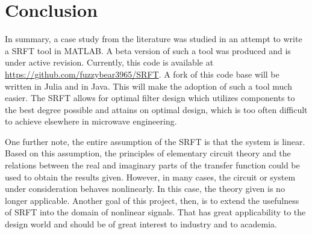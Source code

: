 \section*{Conclusion}

In summary, a case study from the literature was studied in an attempt to write
a SRFT tool in MATLAB\textsuperscript{\textregistered}. A beta version of such a
tool was produced and is under active revision. Currently, this code is
available at \url{https://github.com/fuzzybear3965/SRFT}. A fork of this
code base will be written in Julia and in Java. This will make the adoption of
such a tool much easier. The SRFT allows for optimal filter design which
utilizes components to the best degree possible and attains on optimal design,
which is too often difficult to achieve elsewhere in microwave engineering. 

One further note, the entire assumption of the SRFT is that the system is
linear. Based on this assumption, the principles of elementary circuit theory and
the relations between the real and imaginary parts of the transfer function
could be used to obtain the results given. However, in many cases, the
circuit or system under consideration behaves nonlinearly. In this case, the
theory given is no longer applicable. Another goal of this project, then, is to
extend the usefulness of SRFT into the domain of nonlinear signals. That has
great applicability to the design world and should be of great interest to
industry and to academia.
